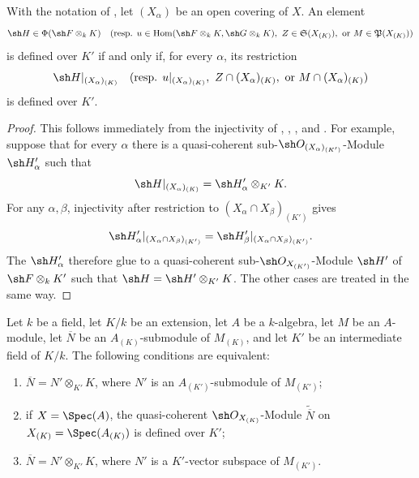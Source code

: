 \begin{proposition}[4.8.5]
\label{IV.4.8.5}
With the notation of , let $(X_\alpha)$ be an open
covering of $X$.
An element
\[
\sh H\in\Phi(\sh F\otimes_kK)
\quad
\text{(resp. }u\in\operatorname{Hom}(\sh F\otimes_kK,\sh G\otimes_kK),
\ Z\in\mathfrak S(X_{(K)}),\
\text{or }M\in\mathfrak P(X_{(K)})\text{)}
\]
is defined over $K'$ if and only if, for every $\alpha$, its
restriction
\[
\sh H|_{(X_\alpha)_{(K)}}
\quad
\text{(resp. }u|_{(X_\alpha)_{(K)}},\
 Z\cap(X_\alpha)_{(K)},\
\text{or }M\cap(X_\alpha)_{(K)}\text{)}
\]
is defined over $K'$.
\end{proposition}

\begin{proof}
This follows immediately from the injectivity of
, , , and
.
For example, suppose that for every $\alpha$ there is a
quasi-coherent sub-$\sh O_{(X_\alpha)_{(K')}}$-Module
$\sh H'_\alpha$ such that
\[
\sh H|_{(X_\alpha)_{(K)}}=\sh H'_\alpha\otimes_{K'}K.
\]
For any $\alpha,\beta$, injectivity after restriction to
$(X_\alpha\cap X_\beta)_{(K')}$ gives
\[
\sh H'_\alpha|_{(X_\alpha\cap X_\beta)_{(K')}}
=
\sh H'_\beta|_{(X_\alpha\cap X_\beta)_{(K')}}.
\]
The $\sh H'_\alpha$ therefore glue to a quasi-coherent
sub-$\sh O_{X_{(K')}}$-Module $\sh H'$ of
$\sh F\otimes_kK'$ such that $\sh H=\sh H'\otimes_{K'}K$.
The other cases are treated in the same way.
\end{proof}

\begin{lemma}[4.8.6]
\label{IV.4.8.6}
Let $k$ be a field, let $K/k$ be an extension, let $A$ be a
$k$-algebra, let $M$ be an $A$-module, let $\overline N$ be an
$A_{(K)}$-submodule of $M_{(K)}$, and let $K'$ be an intermediate
field of $K/k$.
The following conditions are equivalent:
\begin{enumerate}
\item[\rm(a)]
\phantomsection
\label{IV.4.8.6.a}
$\overline N=N'\otimes_{K'}K$, where $N'$ is an
$A_{(K')}$-submodule of $M_{(K')}$;

\item[\rm(b)]
\label{IV.4.8.6.b}
if $X=\Spec(A)$, the quasi-coherent
$\sh O_{X_{(K)}}$-Module $\widetilde{\overline N}$ on
$X_{(K)}=\Spec(A_{(K)})$ is defined over $K'$;

\item[\rm(c)]
\label{IV.4.8.6.c}
$\overline N=N'\otimes_{K'}K$, where $N'$ is a $K'$-vector
subspace of $M_{(K')}$.
\end{enumerate}
\end{lemma}

